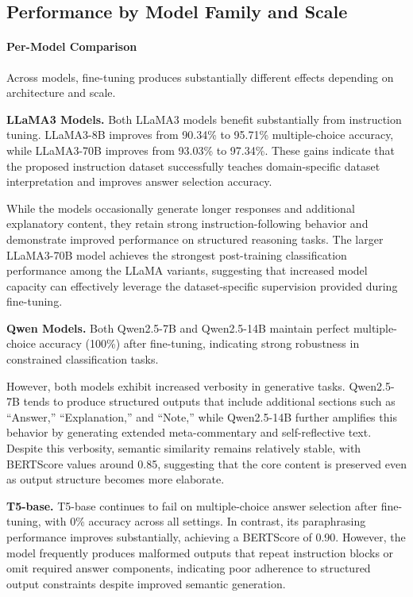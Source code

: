 \documentclass[a4paper,fleqn]{cas-sc}
\begin{document}
\subsection{Performance by Model Family and Scale}

\paragraph{Per-Model Comparison}

Across models, fine-tuning produces substantially different effects depending on architecture and scale.

\textbf{LLaMA3 Models.}
Both LLaMA3 models benefit substantially from instruction tuning. LLaMA3-8B improves from 90.34\% to 95.71\% multiple-choice accuracy, while LLaMA3-70B improves from 93.03\% to 97.34\%. These gains indicate that the proposed instruction dataset successfully teaches domain-specific dataset interpretation and improves answer selection accuracy.

While the models occasionally generate longer responses and additional explanatory content, they retain strong instruction-following behavior and demonstrate improved performance on structured reasoning tasks. The larger LLaMA3-70B model achieves the strongest post-training classification performance among the LLaMA variants, suggesting that increased model capacity can effectively leverage the dataset-specific supervision provided during fine-tuning.

\textbf{Qwen Models.}
Both Qwen2.5-7B and Qwen2.5-14B maintain perfect multiple-choice accuracy (100\%) after fine-tuning, indicating strong robustness in constrained classification tasks. 

However, both models exhibit increased verbosity in generative tasks. Qwen2.5-7B tends to produce structured outputs that include additional sections such as ``Answer,'' ``Explanation,'' and ``Note,'' while Qwen2.5-14B further amplifies this behavior by generating extended meta-commentary and self-reflective text. Despite this verbosity, semantic similarity remains relatively stable, with BERTScore values around 0.85, suggesting that the core content is preserved even as output structure becomes more elaborate.

\textbf{T5-base.}
T5-base continues to fail on multiple-choice answer selection after fine-tuning, with 0\% accuracy across all settings. In contrast, its paraphrasing performance improves substantially, achieving a BERTScore of 0.90. However, the model frequently produces malformed outputs that repeat instruction blocks or omit required answer components, indicating poor adherence to structured output constraints despite improved semantic generation.
\end{document}
